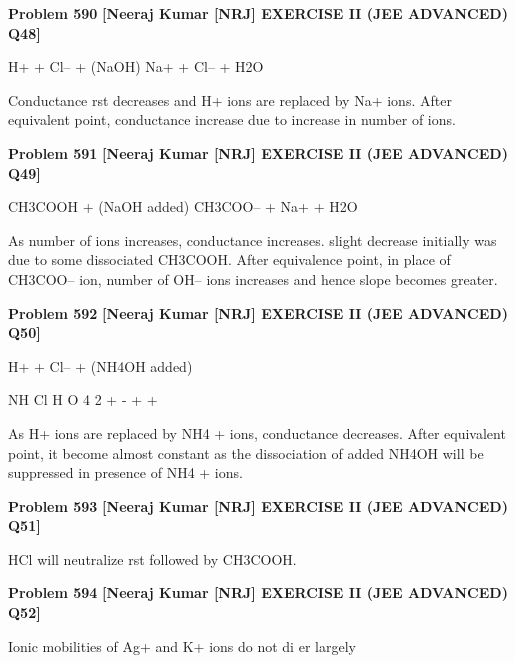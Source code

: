 \begin{problembox}
\textbf{Problem 590} \hfill \textbf{[Neeraj Kumar [NRJ] EXERCISE II (JEE ADVANCED) Q48]}
\label{q:ext-nrj_all_questions-590}

H+ + Cl-- + (NaOH) 
 Na+ + Cl-- + H2O
 
 Conductance   rst decreases and H+ ions are 
replaced by Na+ ions. After equivalent point, 
conductance increase due to increase in number 
of ions.
\end{problembox}

\begin{problembox}
\textbf{Problem 591} \hfill \textbf{[Neeraj Kumar [NRJ] EXERCISE II (JEE ADVANCED) Q49]}
\label{q:ext-nrj_all_questions-591}

CH3COOH + (NaOH added) 
 CH3COO-- 
+ Na+ + H2O 
 
 As number of ions increases, conductance 
increases. slight decrease initially was due to some 
dissociated CH3COOH. After equivalence point, 
in place of CH3COO-- ion, number of OH-- ions 
increases and hence slope becomes greater.
\end{problembox}

\begin{problembox}
\textbf{Problem 592} \hfill \textbf{[Neeraj Kumar [NRJ] EXERCISE II (JEE ADVANCED) Q50]}
\label{q:ext-nrj_all_questions-592}

H+ + Cl-- + (NH4OH added) 
 
  NH
Cl
H O
4
2
+
-
+
+
 
 As H+ ions are replaced by 
NH4
+ ions, 
conductance decreases. After equivalent point, 
it become almost constant as the dissociation of 
added NH4OH will be suppressed in presence of 
NH4
+ ions.
\end{problembox}

\begin{problembox}
\textbf{Problem 593} \hfill \textbf{[Neeraj Kumar [NRJ] EXERCISE II (JEE ADVANCED) Q51]}
\label{q:ext-nrj_all_questions-593}

HCl will neutralize   rst followed by CH3COOH.
\end{problembox}

\begin{problembox}
\textbf{Problem 594} \hfill \textbf{[Neeraj Kumar [NRJ] EXERCISE II (JEE ADVANCED) Q52]}
\label{q:ext-nrj_all_questions-594}

Ionic mobilities of Ag+ and K+ ions do not di  er 
largely
\end{problembox}

